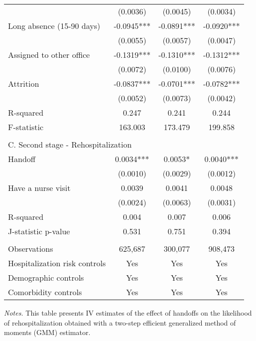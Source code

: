 \documentclass[final,12pt, notitlepage]{article}
\begin{document}
\begin{singlespace}
\begin{table}[H]
\begin{threeparttable}
{\begin{tabular*}{\textwidth}{l@{\extracolsep{\fill}}*{3}{c}}
                  &    (0.0036)     &    (0.0045)     &    (0.0034)   \\
Long absence (15-90 days)&     -0.0945*** &     -0.0891*** &     -0.0920***\\
                 &    (0.0055)      &    (0.0057)      &    (0.0047)   \\
Assigned to other office&     -0.1319*** &     -0.1310*** &     -0.1312***\\
                &    (0.0072)      &    (0.0100)      &    (0.0076)   \\
Attrition        &     -0.0837***  &     -0.0701*** &     -0.0782***\\
                    &    (0.0052)    &    (0.0073)     &    (0.0042)   \\
R-squared           &       0.247   &       0.241    &       0.244   \\
F-statistic       &     163.003        &     173.479     &     199.858   \\
\\
\multicolumn{4}{l}{C. Second stage - Rehospitalization} \\
Handoff         &      0.0034***     &      0.0053*   &      0.0040***\\
                   &    (0.0010)     &    (0.0029)    &    (0.0012)   \\
Have a nurse visit   &      0.0039   &      0.0041    &      0.0048   \\
                    &    (0.0024)     &    (0.0063)    &    (0.0031)   \\
R-squared          &       0.004      &       0.007    &       0.006   \\
J-statistic p-value    &       0.531   &       0.751   &       0.394   \\
\\
\midrule
Observations       &      625,687   &      300,077      &      908,473   \\
Hospitalization risk controls & Yes & Yes & Yes \\
Demographic controls & Yes & Yes & Yes \\
 Comorbidity controls & Yes & Yes & Yes \\
\bottomrule
\end{tabular*}
}
	\begin{tablenotes}
	\scriptsize
	\item \emph{Notes.}  This table presents IV estimates of the effect of handoffs on the likelihood of rehospitalization obtained with a two-step efficient generalized method of moments (GMM) estimator.

\end{tablenotes}
\end{threeparttable}
\end{table}
\end{singlespace}
\end{document}
